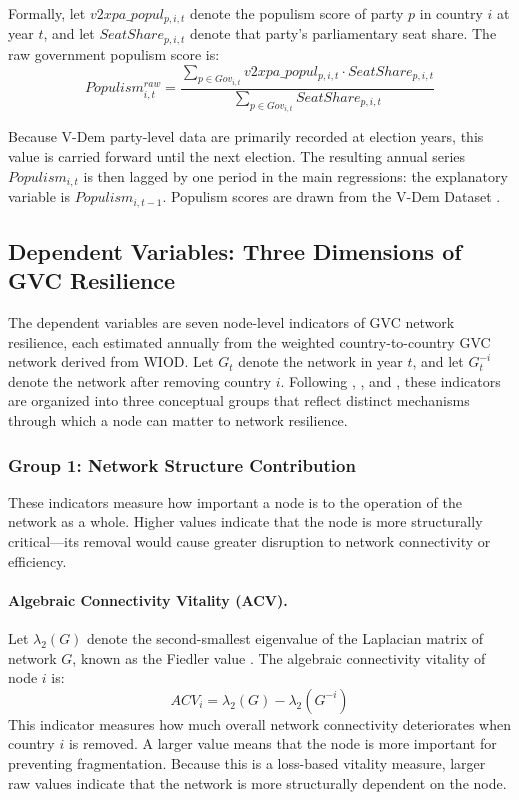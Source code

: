 \documentclass[12pt]{article}
\begin{document}
Formally, let $v2xpa\_popul_{p,i,t}$ denote the populism score of party $p$ in country $i$ at year $t$, and let $SeatShare_{p,i,t}$ denote that party's parliamentary seat share. The raw government populism score is:
\begin{equation}
Populism^{raw}_{i,t} = \frac{\sum_{p \in Gov_{i,t}} v2xpa\_popul_{p,i,t} \cdot SeatShare_{p,i,t}}{\sum_{p \in Gov_{i,t}} SeatShare_{p,i,t}}
\end{equation}

Because V-Dem party-level data are primarily recorded at election years, this value is carried forward until the next election. The resulting annual series $Populism_{i,t}$ is then lagged by one period in the main regressions: the explanatory variable is $Populism_{i,t-1}$. Populism scores are drawn from the V-Dem Dataset \citep{coppedge2022, pemstein2018, hawkins2009, hawkinsteam2019}.

\subsection{Dependent Variables: Three Dimensions of GVC Resilience}

The dependent variables are seven node-level indicators of GVC network resilience, each estimated annually from the weighted country-to-country GVC network derived from WIOD. Let $G_t$ denote the network in year $t$, and let $G_t^{-i}$ denote the network after removing country $i$. Following \citet{newman2010}, \citet{albert2002}, and \citet{gao2016}, these indicators are organized into three conceptual groups that reflect distinct mechanisms through which a node can matter to network resilience.

\subsubsection*{Group 1: Network Structure Contribution}

These indicators measure how important a node is to the operation of the network as a whole. Higher values indicate that the node is more structurally critical---its removal would cause greater disruption to network connectivity or efficiency.

\paragraph{Algebraic Connectivity Vitality (ACV).} Let $\lambda_2(G)$ denote the second-smallest eigenvalue of the Laplacian matrix of network $G$, known as the Fiedler value \citep{fiedler1973}. The algebraic connectivity vitality of node $i$ is:
\begin{equation}
ACV_i = \lambda_2(G) - \lambda_2(G^{-i})
\end{equation}
This indicator measures how much overall network connectivity deteriorates when country $i$ is removed. A larger value means that the node is more important for preventing fragmentation. Because this is a loss-based vitality measure, larger raw values indicate that the network is more structurally dependent on the node.
\end{document}
